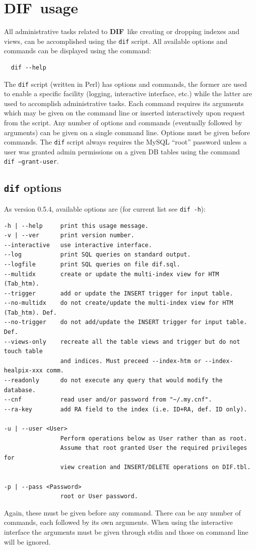 \documentclass[10pt,titlepage]{article}
\newcommand{\dif}{\textbf{\small DIF}}
\begin{document}
\section{\dif\ usage}
\label{sec:usage}
All administrative tasks related to \dif\, like creating or dropping
indexes and views, can be accomplished using the \verb|dif|
script. All available options and commands can be displayed using the command:
%
\begin{verbatim}
  dif --help
\end{verbatim}
%
The {\tt dif} script (written in Perl) has options and commands,
the former are used to enable a specific facility (logging, interactive
interface, etc.) while the latter are used to accomplish administrative
tasks. Each command requires its arguments which may be given on the
command line or inserted interactively upon request from the
script. Any number of options and commands (eventually followed by
arguments) can be given on a single command line. Options must be
given before commands. The {\tt dif} script always requires the MySQL
``root'' password unless a user was granted admin permissions on a given DB
tables using the command \texttt{dif --grant-user}.

\subsection{{\tt dif} options}
As version 0.5.4, available options are (for current list see \verb|dif -h|):
%
\begin{verbatim}
-h | --help     print this usage message.
-v | --ver      print version number.
--interactive   use interactive interface.
--log           print SQL queries on standard output.
--logfile       print SQL queries on file dif.sql.
--multidx       create or update the multi-index view for HTM (Tab_htm).
--trigger       add or update the INSERT trigger for input table.
--no-multidx    do not create/update the multi-index view for HTM (Tab_htm). Def.
--no-trigger    do not add/update the INSERT trigger for input table. Def.
--views-only    recreate all the table views and trigger but do not touch table
                and indices. Must preceed --index-htm or --index-healpix-xxx comm.
--readonly      do not execute any query that would modify the database.
--cnf           read user and/or password from "~/.my.cnf".
--ra-key        add RA field to the index (i.e. ID+RA, def. ID only).

-u | --user <User>
                Perform operations below as User rather than as root.
                Assume that root granted User the required privileges for
                view creation and INSERT/DELETE operations on DIF.tbl.

-p | --pass <Password>
                root or User password.
\end{verbatim}
%
Again, these must be given before any command.
There can be any number of commands, each followed by its own
arguments. When using the interactive interface the arguments must be
given through stdin and those on command line will be ignored.
\end{document}
